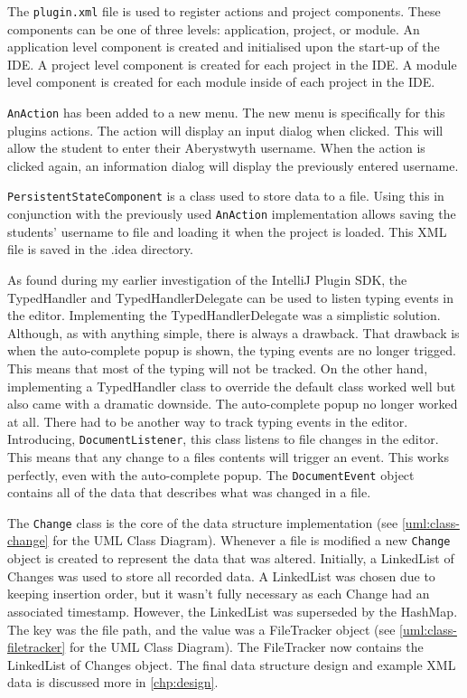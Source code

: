 The \texttt{plugin.xml} file is used to register actions and project components. These components can be one of three levels: application, project, or module\cite{IntelliJProjectComponents}. An application level component is created and initialised upon the start-up of the IDE. A project level component is created for each project in the IDE. A module level component is created for each module inside of each project in the IDE.

\texttt{AnAction} has been added to a new menu. The new menu is specifically for this plugins actions. The action will display an input dialog when clicked. This will allow the student to enter their Aberystwyth username. When the action is clicked again, an information dialog will display the previously entered username.

\texttt{PersistentStateComponent} is a class used to store data to a file. Using this in conjunction with the previously used \texttt{AnAction} implementation allows saving the students' username to file and loading it when the project is loaded. This XML file is saved in the .idea directory.

As found during my earlier investigation of the IntelliJ Plugin SDK, the TypedHandler and TypedHandlerDelegate can be used to listen typing events in the editor. Implementing the TypedHandlerDelegate was a simplistic solution. Although, as with anything simple, there is always a drawback. That drawback is when the auto-complete popup is shown, the typing events are no longer trigged. This means that most of the typing will not be tracked. On the other hand, implementing a TypedHandler class to override the default class worked well but also came with a dramatic downside. The auto-complete popup no longer worked at all. There had to be another way to track typing events in the editor. Introducing, \texttt{DocumentListener}, this class listens to file changes in the editor. This means that any change to a files contents will trigger an event. This works perfectly, even with the auto-complete popup. The \texttt{DocumentEvent} object contains all of the data that describes what was changed in a file.

The \texttt{Change} class is the core of the data structure implementation (see \autoref{uml:class-change} for the UML Class Diagram). Whenever a file is modified a new \texttt{Change} object is created to represent the data that was altered. Initially, a LinkedList of Changes was used to store all recorded data. A LinkedList was chosen due to keeping insertion order, but it wasn't fully necessary as each Change had an associated timestamp. However, the LinkedList was superseded by the HashMap. The key was the file path, and the value was a FileTracker object (see \autoref{uml:class-filetracker} for the UML Class Diagram). The FileTracker now contains the LinkedList of Changes  object. The final data structure design and example XML data is discussed more in \autoref{chp:design}.

